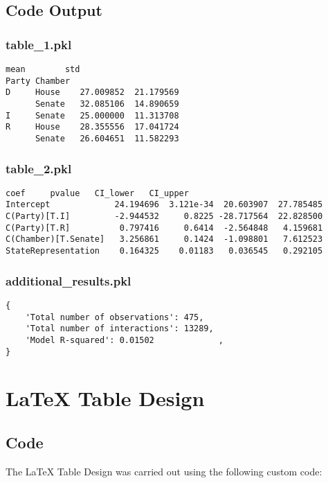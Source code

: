 \documentclass[11pt]{article}
\begin{document}
\subsection{Code Output}

\subsubsection*{table\_1.pkl}

\begin{Verbatim}[tabsize=4]
                    mean        std
Party Chamber
D     House    27.009852  21.179569
      Senate   32.085106  14.890659
I     Senate   25.000000  11.313708
R     House    28.355556  17.041724
      Senate   26.604651  11.582293
\end{Verbatim}

\subsubsection*{table\_2.pkl}

\begin{Verbatim}[tabsize=4]
                           coef     pvalue   CI_lower   CI_upper
Intercept             24.194696  3.121e-34  20.603907  27.785485
C(Party)[T.I]         -2.944532     0.8225 -28.717564  22.828500
C(Party)[T.R]          0.797416     0.6414  -2.564848   4.159681
C(Chamber)[T.Senate]   3.256861     0.1424  -1.098801   7.612523
StateRepresentation    0.164325    0.01183   0.036545   0.292105
\end{Verbatim}

\subsubsection*{additional\_results.pkl}

\begin{Verbatim}[tabsize=4]
{
    'Total number of observations': 475,
    'Total number of interactions': 13289,
    'Model R-squared': 0.01502             ,
}
\end{Verbatim}

\section{LaTeX Table Design}
\subsection{{Code}}
The LaTeX Table Design was carried out using the following custom code:
\end{document}
